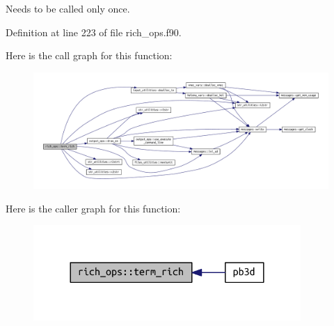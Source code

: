 Needs to be called only once. 

Definition at line 223 of file rich\+\_\+ops.\+f90.

Here is the call graph for this function\+:\nopagebreak
\begin{figure}[H]
\begin{center}
\leavevmode
\includegraphics[width=350pt]{namespacerich__ops_a3cf72a3ed0806ac9ddff262a00b2e33d_cgraph}
\end{center}
\end{figure}
Here is the caller graph for this function\+:\nopagebreak
\begin{figure}[H]
\begin{center}
\leavevmode
\includegraphics[width=288pt]{namespacerich__ops_a3cf72a3ed0806ac9ddff262a00b2e33d_icgraph}
\end{center}
\end{figure}
